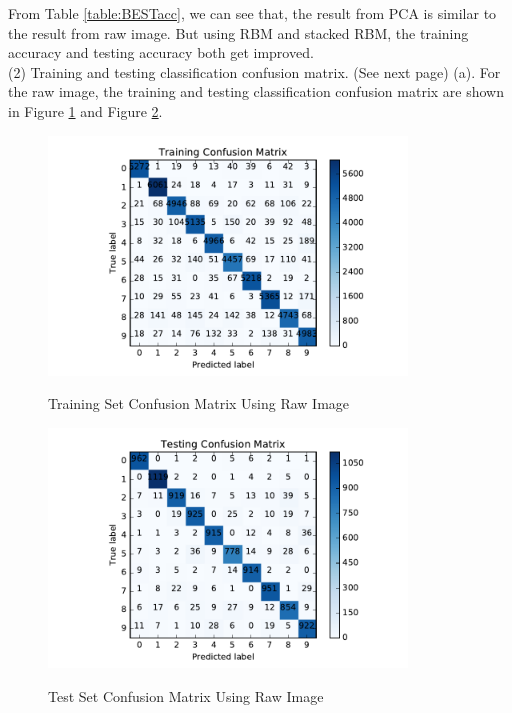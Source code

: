 From Table \ref{table:BESTacc}, we can see that, the result from PCA is similar to the result from raw image. But using RBM and stacked RBM, the training accuracy and testing accuracy both get improved.\\

\noindent (2) Training and testing classification confusion matrix. (See next page)
\newpage
(a). For the raw image, the training and testing classification confusion matrix are shown in Figure \ref{fig:train_raw} and Figure \ref{fig:test_raw}.

\begin{figure}[H]
\centering
\includegraphics[width=0.85\textwidth]{./figures/train_raw.pdf}\
\caption{\label{fig:train_raw} Training Set Confusion Matrix Using Raw Image}
\end{figure}

\begin{figure}[H]
\centering
\includegraphics[width=0.85\textwidth]{./figures/test_raw.pdf}\
\caption{\label{fig:test_raw} Test Set Confusion Matrix Using Raw Image}
\end{figure}


